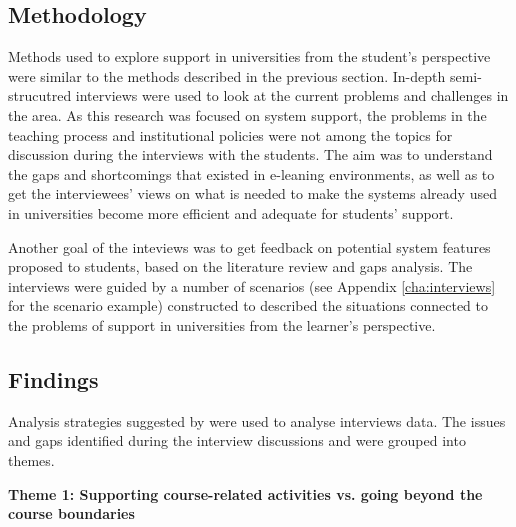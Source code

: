 \subsection{Methodology}

Methods used to explore \LLLs support in universities from the student's
perspective were similar to the methods described in the previous section.
In-depth semi-strucutred interviews were used to look at the current problems
and challenges in the area. As this research was focused on system support, the
problems in the teaching process and institutional policies were not among the
topics for discussion during the interviews with the students. The aim was to
understand the gaps and shortcomings that existed in e-leaning environments, as
well as to get the interviewees' views on what is needed to make the systems
already used in universities become more efficient and adequate for students'
\LLLs support.

Another goal of the inteviews was to get feedback on potential system features
proposed to students, based on the literature review and gaps analysis. The
interviews were guided by a number of scenarios (see Appendix
\ref{cha:interviews} for the scenario example) constructed to described the
situations connected to the problems of \LLLs support in universities from the
learner's perspective.


\subsection{Findings}

Analysis strategies suggested by \citet{Marshall2010} were used to analyse
interviews data. The issues and gaps identified during the interview
discussions and were grouped into themes.

\textbf{Theme 1: Supporting course-related activities vs. going beyond the
course boundaries}


